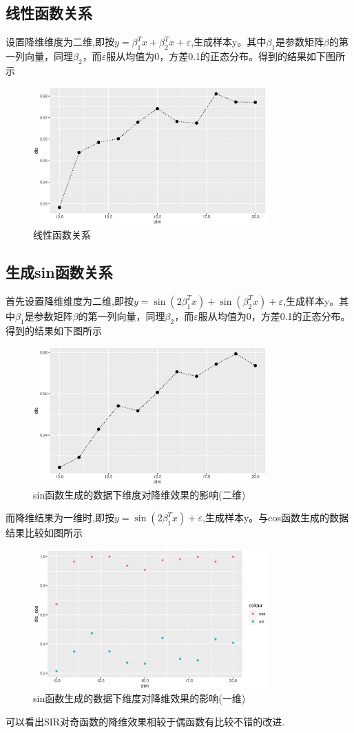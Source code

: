 \subsection{线性函数关系}
设置降维维度为二维,即按$y=\beta_1^Tx+\beta_2^Tx+\varepsilon$,生成样本y。其中$\beta_1$是参数矩阵$\beta$的第一列向量，同理$\beta_2$，而$\varepsilon$服从均值为0，方差0.1的正态分布。得到的结果如下图所示
\begin{figure}[H]
    \centering
    \includegraphics[width=0.8\textwidth]{image/norm_sir.eps}
    \caption{线性函数关系}
\end{figure}


\subsection{生成sin函数关系}

首先设置降维维度为二维,即按$y=\sin(2\beta_1^Tx)+\sin(\beta_2^Tx)+\varepsilon$,生成样本y。其中$\beta_1$是参数矩阵$\beta$的第一列向量，同理$\beta_2$，而$\varepsilon$服从均值为0，方差0.1的正态分布。得到的结果如下图所示
    \begin{figure}[H]
        \centering
        \includegraphics[width=0.8\textwidth]{image/sin_sir.eps}
        \caption{sin函数生成的数据下维度对降维效果的影响(二维)}
    \end{figure}

而降维结果为一维时,即按$y=\sin(2\beta_1^Tx)+\varepsilon$,生成样本y。与cos函数生成的数据结果比较如图所示
\begin{figure}[H]
    \centering
    \includegraphics[width=0.8\textwidth]{image/compare_sir.eps}
    \caption{sin函数生成的数据下维度对降维效果的影响(一维)}
\end{figure}
可以看出SIR对奇函数的降维效果相较于偶函数有比较不错的改进.